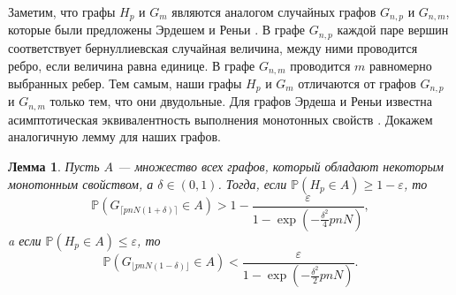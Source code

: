 \documentclass{matmex-diploma-custom}
\newcommand{\PRob}{\mathbb P}
\newcommand{\leqs}{\leqslant}
\newcommand{\geqs}{\geqslant}
\newcommand{\eps}{\varepsilon}
\newtheorem{lemma}{Лемма}
\theoremstyle{named}
\begin{document}
Заметим, что графы $H_p$ и $G_m$ являются аналогом случайных графов $G_{n, p}$ и $G_{n, m}$, 
которые были предложены Эрдешем и Реньи \cite{erd}. 
В графе $G_{n,p}$ каждой паре вершин соответствует бернуллиевская случайная величина, между ними проводится ребро, 
если величина равна единице. В графе $G_{n, m}$ проводится $m$ равномерно выбранных ребер.
Тем самым, наши графы $H_p$ и $G_m$ отличаются от графов $G_{n, p}$ и $G_{n, m}$ только тем, что они двудольные.
Для графов Эрдеша и Реньи известна асимптотическая эквивалентность выполнения монотонных свойств \cite[параграф 1.4]{janson}.
Докажем аналогичную лемму для наших графов.

\begin{lemma} \label{l1}
Пусть $A$ --- множество всех графов, который обладают некоторым монотонным свойством, а $\delta \in (0,1)$.
Тогда, если $\PRob( H_p \in A) \geqs 1 - \eps$, то
\begin{equation} \label{l1_1}
\PRob(G_{\lceil pnN(1+\delta) \rceil} \in A) > 1 - \frac{\eps}{1 - \exp\left(-\frac{\delta^2}{4}pnN\right)},
\end{equation}
a если $\PRob( H_p \in A) \leqs \eps$, то
\begin{equation}\label{l1_2}
\PRob(G_{\lfloor pnN(1-\delta) \rfloor} \in A) < \frac{\eps}{1 - \exp\left(-\frac{\delta^2}{2}pnN\right)}.
\end{equation}
\end{lemma}
\end{document}
